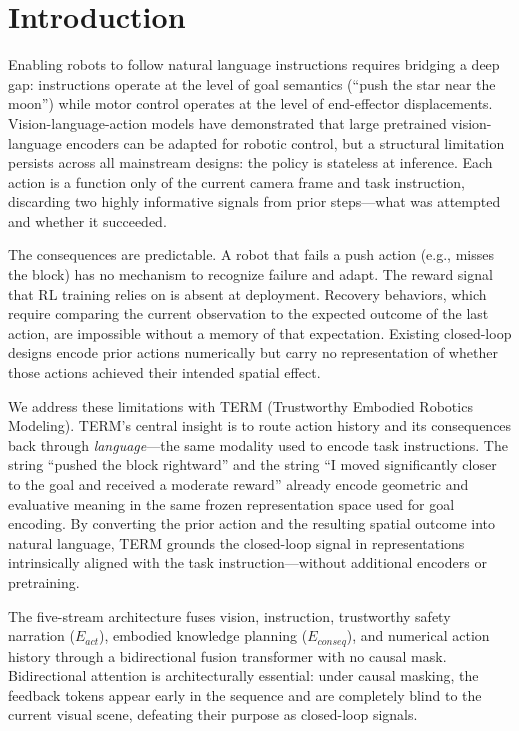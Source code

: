 \documentclass[letterpaper]{article} %
\begin{document}
\section{Introduction}

Enabling robots to follow natural language instructions requires bridging a deep gap: instructions operate at the level of goal semantics (``push the star near the moon'') while motor control operates at the level of end-effector displacements. Vision-language-action models \cite{brohan2023rt2,black2024pi0,kim2024openvla} have demonstrated that large pretrained vision-language encoders can be adapted for robotic control, but a structural limitation persists across all mainstream designs: the policy is stateless at inference. Each action is a function only of the current camera frame and task instruction, discarding two highly informative signals from prior steps---what was attempted and whether it succeeded.

The consequences are predictable. A robot that fails a push action (e.g., misses the block) has no mechanism to recognize failure and adapt. The reward signal that RL training relies on is absent at deployment. Recovery behaviors, which require comparing the current observation to the expected outcome of the last action, are impossible without a memory of that expectation. Existing closed-loop designs \cite{hejna2025pi05,durante2024agent} encode prior actions numerically but carry no representation of whether those actions achieved their intended spatial effect.

We address these limitations with TERM (Trustworthy Embodied Robotics Modeling). TERM's central insight is to route action history and its consequences back through \emph{language}---the same modality used to encode task instructions. The string ``pushed the block rightward'' and the string ``I moved significantly closer to the goal and received a moderate reward'' already encode geometric and evaluative meaning in the same frozen representation space used for goal encoding. By converting the prior action and the resulting spatial outcome into natural language, TERM grounds the closed-loop signal in representations intrinsically aligned with the task instruction---without additional encoders or pretraining.

The five-stream architecture fuses vision, instruction, trustworthy safety narration ($E_{act}$), embodied knowledge planning ($E_{conseq}$), and numerical action history through a bidirectional fusion transformer with no causal mask. Bidirectional attention is architecturally essential: under causal masking, the feedback tokens appear early in the sequence and are completely blind to the current visual scene, defeating their purpose as closed-loop signals.
\end{document}
